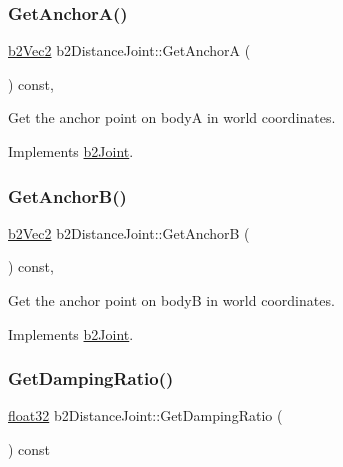 \subsubsection{\texorpdfstring{GetAnchorA()}{GetAnchorA()}}
{\footnotesize\ttfamily \mbox{\hyperlink{structb2_vec2}{b2\+Vec2}} b2\+Distance\+Joint\+::\+Get\+AnchorA (\begin{DoxyParamCaption}{ }\end{DoxyParamCaption}) const\hspace{0.3cm}{\ttfamily [override]}, {\ttfamily [virtual]}}



Get the anchor point on bodyA in world coordinates. 



Implements \mbox{\hyperlink{classb2_joint_abe46ca3aad5db73909a9b5a7b2117447}{b2\+Joint}}.

\mbox{\label{classb2_distance_joint_a05bf71de10904c87e3a5295aa04a8aa6}} 
\subsubsection{\texorpdfstring{GetAnchorB()}{GetAnchorB()}}
{\footnotesize\ttfamily \mbox{\hyperlink{structb2_vec2}{b2\+Vec2}} b2\+Distance\+Joint\+::\+Get\+AnchorB (\begin{DoxyParamCaption}{ }\end{DoxyParamCaption}) const\hspace{0.3cm}{\ttfamily [override]}, {\ttfamily [virtual]}}



Get the anchor point on bodyB in world coordinates. 



Implements \mbox{\hyperlink{classb2_joint_a88e947c65d4ea26fe539f02a8cb7f7a9}{b2\+Joint}}.

\mbox{\label{classb2_distance_joint_a5c8ee3cfcadc356b957d71582b720056}} 
\subsubsection{\texorpdfstring{GetDampingRatio()}{GetDampingRatio()}}
{\footnotesize\ttfamily \mbox{\hyperlink{b2_settings_8h_aacdc525d6f7bddb3ae95d5c311bd06a1}{float32}} b2\+Distance\+Joint\+::\+Get\+Damping\+Ratio (\begin{DoxyParamCaption}{ }\end{DoxyParamCaption}) const\hspace{0.3cm}{\ttfamily [inline]}}

